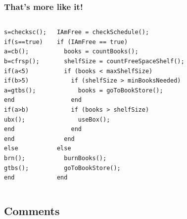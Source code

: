 \documentclass[11pt,table,final,fleqn,xcolor={usenames,dvipsnames},unknownkeysallowed,handout]{beamer}
\begin{document}
\begin{frame}[fragile]
 \frametitle{That's more like it!}
 \begin{columns}[T]
     \begin{lstlisting}
s=checksc();
if(s==true)
a=cb();
b=cfrsp();
if(a<5)
if(b>5)
a=gtbs();
end
if(a>b)
ubx();
end
end
else
brn();
gtbs();
end
 \end{lstlisting}
     \begin{lstlisting}
IAmFree = checkSchedule();
if (IAmFree == true)
  books = countBooks();
  shelfSize = countFreeSpaceShelf();
  if (books < maxShelfSize)
    if (shelfSize > minBooksNeeded)
      books = goToBookStore();
    end
    if (books > shelfSize)
      useBox();
    end
  end
else
  burnBooks();
  goToBookStore();
end
 \end{lstlisting}
 \end{columns}
\end{frame}

\subsection*{Comments}
\end{document}
